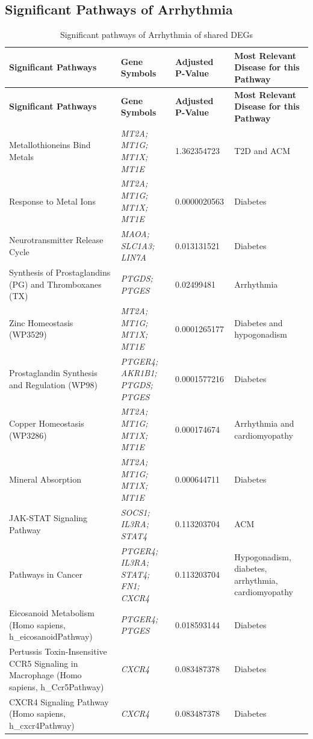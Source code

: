 \subsection{Significant Pathways of Arrhythmia}
\begin{longtable}{|p{4cm}|p{5cm}|p{2cm}|p{4cm}|}
    \caption[Significant pathways of Arrhythmia of shared DEGs]{Significant pathways of Arrhythmia of shared DEGs}\label{tab:Arrhythmia_pathways} \\
    \hline
    \textbf{Significant Pathways} & \textbf{Gene Symbols} & \textbf{Adjusted P-Value} & \textbf{Most Relevant Disease for this Pathway} \\
    \hline
    \endhead
    \hline
    \endfoot
    \hline
    \endfirsthead
    \textbf{Significant Pathways} & \textbf{Gene Symbols} & \textbf{Adjusted P-Value} & \textbf{Most Relevant Disease for this Pathway} \\
    \hline
    \endfirsthead
    \hline
    \endlastfoot

    \renewcommand{\arraystretch}{1.2} %
    \small
    Metallothioneins Bind Metals & \textit{MT2A; MT1G; MT1X; MT1E} & 1.362354723 & T2D and ACM \\
    \hline
    Response to Metal Ions & \textit{MT2A; MT1G; MT1X; MT1E} & 0.0000020563 & Diabetes \\
    \hline
    Neurotransmitter Release Cycle & \textit{MAOA; SLC1A3; LIN7A} & 0.013131521 & Diabetes \\
    \hline
    Synthesis of Prostaglandins (PG) and Thromboxanes (TX) & \textit{PTGDS; PTGES} & 0.02499481 & Arrhythmia \\
    \hline
    Zinc Homeostasis (WP3529) & \textit{MT2A; MT1G; MT1X; MT1E} & 0.0001265177 & Diabetes and hypogonadism \\
    \hline
    Prostaglandin Synthesis and Regulation (WP98) & \textit{PTGER4; AKR1B1; PTGDS; PTGES} & 0.0001577216 & Diabetes \\
    \hline
    Copper Homeostasis (WP3286) & \textit{MT2A; MT1G; MT1X; MT1E} & 0.000174674 & Arrhythmia and cardiomyopathy \\
    \hline
    Mineral Absorption & \textit{MT2A; MT1G; MT1X; MT1E} & 0.000644711 & Diabetes \\
    \hline
    JAK-STAT Signaling Pathway & \textit{SOCS1; IL3RA; STAT4} & 0.113203704 & ACM \\
    \hline
    Pathways in Cancer & \textit{PTGER4; IL3RA; STAT4; FN1; CXCR4} & 0.113203704 & Hypogonadism, diabetes, arrhythmia, cardiomyopathy \\
    \hline
    Eicosanoid Metabolism (Homo sapiens, h\_eicosanoidPathway) & \textit{PTGER4; PTGES} & 0.018593144 & Diabetes \\
    \hline
    Pertussis Toxin-Insensitive CCR5 Signaling in Macrophage (Homo sapiens, h\_Ccr5Pathway) & \textit{CXCR4} & 0.083487378 & Diabetes \\
    \hline
    CXCR4 Signaling Pathway (Homo sapiens, h\_cxcr4Pathway) & \textit{CXCR4} & 0.083487378 & Diabetes \\
    \hline
\end{longtable}

